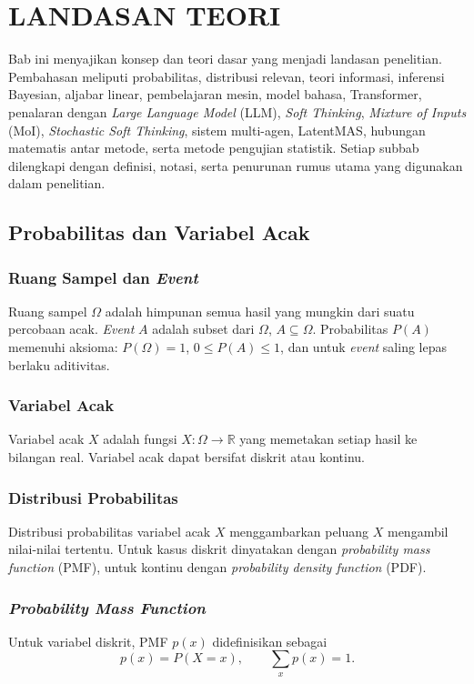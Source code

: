 \chapter{LANDASAN TEORI}


Bab ini menyajikan konsep dan teori dasar yang menjadi landasan penelitian. Pembahasan meliputi probabilitas, distribusi relevan, teori informasi, inferensi Bayesian, aljabar linear, pembelajaran mesin, model bahasa, Transformer, penalaran dengan \textit{Large Language Model} (LLM), \textit{Soft Thinking}, \textit{Mixture of Inputs} (MoI), \textit{Stochastic Soft Thinking}, sistem multi-agen, LatentMAS, hubungan matematis antar metode, serta metode pengujian statistik. Setiap subbab dilengkapi dengan definisi, notasi, serta penurunan rumus utama yang digunakan dalam penelitian.

\section{Probabilitas dan Variabel Acak}

\subsection{Ruang Sampel dan \textit{Event}}
Ruang sampel \(\Omega\) adalah himpunan semua hasil yang mungkin dari suatu percobaan acak. \textit{Event} \(A\) adalah subset dari \(\Omega\), \(A \subseteq \Omega\). Probabilitas \(P(A)\) memenuhi aksioma: \(P(\Omega)=1\), \(0 \le P(A) \le 1\), dan untuk \textit{event} saling lepas berlaku aditivitas.

\subsection{Variabel Acak}
Variabel acak \(X\) adalah fungsi \(X:\Omega \rightarrow \mathbb{R}\) yang memetakan setiap hasil ke bilangan real. Variabel acak dapat bersifat diskrit atau kontinu.

\subsection{Distribusi Probabilitas}
Distribusi probabilitas variabel acak \(X\) menggambarkan peluang \(X\) mengambil nilai-nilai tertentu. Untuk kasus diskrit dinyatakan dengan \textit{probability mass function} (PMF), untuk kontinu dengan \textit{probability density function} (PDF).

\subsection{\textit{Probability Mass Function}}
Untuk variabel diskrit, PMF \(p(x)\) didefinisikan sebagai
\begin{equation}
p(x) = P(X = x), \qquad \sum_{x} p(x) = 1.
\end{equation}

